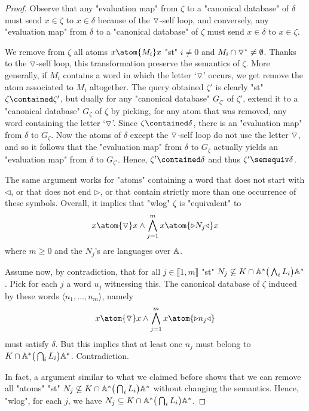 \begin{proof}
	Observe that any "evaluation map" from $\zeta$ to a "canonical database"
	of $\delta$ must send $x \in \zeta$ to $x \in \delta$ because of the $\triangledown$-self loop,
	and conversely, any "evaluation map" from $\delta$ to a "canonical database"
	of $\zeta$ must send $x \in \delta$ to $x \in \zeta$.

	We remove from $\zeta$ all atoms $x \atom{M_i} x$ "st" $i \neq 0$
	and $M_i \cap {\triangledown^*} \neq\emptyset$. Thanks to the
	$\triangledown$-self loop, this transformation preserve the semantics of $\zeta$.
	More generally, if $M_i$ contains a word in which the letter `$\triangledown$' occurs, we get remove 
	the atom associated to $M_i$ altogether. The query obtained $\zeta'$ is clearly
	"st" $\zeta \contained \zeta'$, but dually for any "canonical database" $G_{\zeta'}$ of
	$\zeta'$, extend it to a "canonical database" $G_{\zeta}$ of $\zeta$ by picking, for any
	atom that was removed, any word containing the letter `$\triangledown$'.
	Since $\zeta \contained \delta$, there is an "evaluation map" from $\delta$
	to $G_{\zeta}$. Now the atoms of $\delta$ except the $\triangledown$-self loop
	do not use the letter $\triangledown$, and so it follows that the
	"evaluation map" from $\delta$ to $G_{\zeta}$ actually yields
	an "evaluation map" from $\delta$ to $G_{\zeta'}$.
	Hence, $\zeta' \contained \delta$ and thus $\zeta' \semequiv \delta$.

	The same argument works for "atoms" containing a word that does not
	start with $\triangleleft$, or that does not end $\triangleright$,
	or that contain strictly more than one occurrence of these symbols.
	Overall, it implies that "wlog" $\zeta$ is "equivalent" to
	\[
		x \atom{\marking} x \land \bigwedge_{j=1}^{m} x \atom{\triangleright N_j \triangleleft} x
	\]
	where $m \geq 0$ and the $N_j$'s are languages over $\mathbb{A}$.

	Assume now, by contradiction, that for all $j \in \lBrack 1,m \rBrack$
	"st" $N_j \not\subseteq K \cap \mathbb{A}^* \big(\bigwedge_i L_i\big) \mathbb{A}^*$. Pick for each $j$ a word $u_j$ witnessing this. 
	The canonical database of $\zeta$ induced by these
	words $\langle n_1, \hdots, n_m \rangle$, namely
	\[x \atom{\marking} x \land \bigwedge_{j=1}^m x \atom{\triangleright n_j \triangleleft}\]
	must satisfy $\delta$. But this implies that at least one $n_j$ must belong to
	$K \cap \mathbb{A}^* \big(\bigcap_i L_i\big) \mathbb{A}^*$.
	Contradiction.
	
	In fact, a argument similar to what we claimed before shows that
	we can remove all "atoms" "st" $N_j \not\subseteq K \cap \mathbb{A}^* \big(\bigcap_i L_i\big) \mathbb{A}^*$ without changing the semantics.
	Hence, "wlog", for each $j$, we have $N_j \subseteq K \cap \mathbb{A}^* \big(\bigcap_i L_i\big) \mathbb{A}^*$.


\end{proof}
